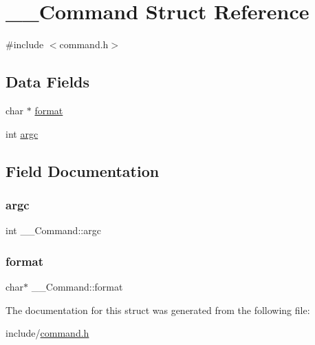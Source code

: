 \hypertarget{struct_____command}{}\section{\+\_\+\+\_\+\+Command Struct Reference}
\label{struct_____command}


{\ttfamily \#include $<$command.\+h$>$}

\subsection*{Data Fields}
\begin{DoxyCompactItemize}
\item 
char $\ast$ \mbox{\hyperlink{struct_____command_a1c0253e6cfc982c6bb80dae3fddb5162}{format}}
\item 
int \mbox{\hyperlink{struct_____command_aa6f80bbad8e3e02a754628e3a49d30a4}{argc}}
\end{DoxyCompactItemize}


\subsection{Field Documentation}
\mbox{\label{struct_____command_aa6f80bbad8e3e02a754628e3a49d30a4}} 
\subsubsection{\texorpdfstring{argc}{argc}}
{\footnotesize\ttfamily int \+\_\+\+\_\+\+Command\+::argc}

\mbox{\label{struct_____command_a1c0253e6cfc982c6bb80dae3fddb5162}} 
\subsubsection{\texorpdfstring{format}{format}}
{\footnotesize\ttfamily char$\ast$ \+\_\+\+\_\+\+Command\+::format}



The documentation for this struct was generated from the following file\+:\begin{DoxyCompactItemize}
\item 
include/\mbox{\hyperlink{command_8h}{command.\+h}}\end{DoxyCompactItemize}
